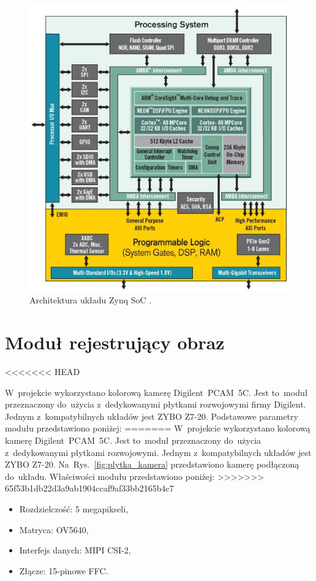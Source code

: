 \begin{figure}[h]
	\centering
	\includegraphics[width=\textwidth]{zynq.png}
	\caption{Architektura układu Zynq SoC \cite{zynq}.}
	\label{fig:zynq}
\end{figure}


\section{Moduł rejestrujący obraz}
\label{sec:pcam}
<<<<<<< HEAD

W~projekcie wykorzystano kolorową kamerę Digilent~PCAM~5C. 
Jest to~moduł przeznaczony do~użycia z~dedykowanymi płytkami rozwojowymi firmy Digilent. 
Jednym z~kompatybilnych układów jest ZYBO Z7-20. 
Podstawowe parametry modułu przedstawiono poniżej:
=======
W~projekcie wykorzystano kolorową kamerę Digilent~PCAM~5C. Jest to~moduł przeznaczony do~użycia z~dedykowanymi płytkami rozwojowymi. Jednym z~kompatybilnych układów jest ZYBO Z7-20. Na~Rys.~\ref{fig:plytka_kamera} przedstawiono kamerę podłączoną do~układu. Właściwości modułu przedstawiono poniżej:
>>>>>>> 65f53b1db22d3a9ab1904ccaf9af33bb2165b4c7
\begin{itemize}
	\item Rozdzielczość: 5 megapikseli,
	\item Matryca: OV5640,
	\item Interfejs danych: MIPI CSI-2,
	\item Złącze: 15-pinowe FFC.
\end{itemize}

